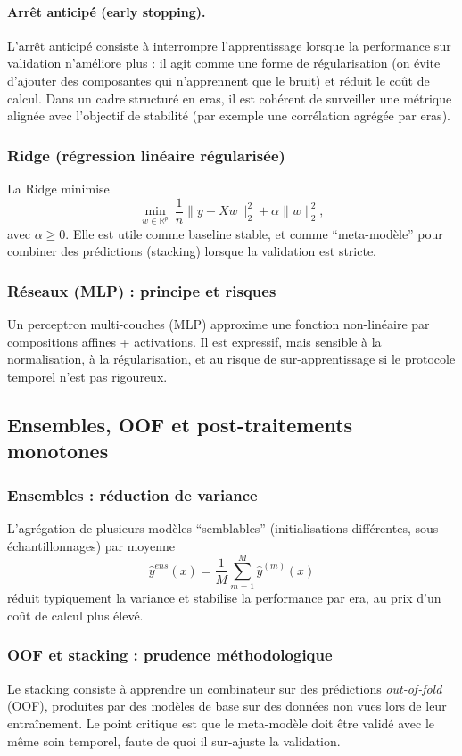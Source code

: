 \documentclass[11pt,a4paper]{article}
\newcommand{\R}{\mathbb{R}}
\newcommand{\1}{\mathbf{1}}
\begin{document}
\paragraph{Arr\^et anticip\'e (early stopping).}
L'arr\^et anticip\'e consiste \`a interrompre l'apprentissage lorsque la performance sur validation n'am\'eliore plus : il agit comme une forme
de r\'egularisation (on \'evite d'ajouter des composantes qui n'apprennent que le bruit) et r\'eduit le co\^ut de calcul.
Dans un cadre structur\'e en eras, il est coh\'erent de surveiller une m\'etrique align\'ee avec l'objectif de stabilit\'e (par exemple une corr\'elation agr\'eg\'ee par eras).

\subsubsection{Ridge (r\'egression lin\'eaire r\'egularis\'ee)}
La Ridge minimise
\[
\min_{w\in\R^p}\ \frac{1}{n}\|y-Xw\|_2^2 + \alpha\|w\|_2^2,
\]
avec $\alpha\ge 0$. Elle est utile comme baseline stable, et comme ``meta-mod\`ele'' pour combiner des pr\'edictions (stacking) lorsque la validation est stricte.

\subsubsection{R\'eseaux (MLP) : principe et risques}
Un perceptron multi-couches (MLP) approxime une fonction non-lin\'eaire par compositions affines + activations. Il est expressif, mais sensible \`a la
normalisation, \`a la r\'egularisation, et au risque de sur-apprentissage si le protocole temporel n'est pas rigoureux.

\subsection{Ensembles, OOF et post-traitements monotones}

\subsubsection{Ensembles : r\'eduction de variance}
L'agr\'egation de plusieurs mod\`eles ``semblables'' (initialisations diff\'erentes, sous-\'echantillonnages) par moyenne
\[
\widehat y^{ens}(x)=\frac{1}{M}\sum_{m=1}^M \widehat y^{(m)}(x)
\]
r\'eduit typiquement la variance et stabilise la performance par era, au prix d'un co\^ut de calcul plus \'elev\'e.

\subsubsection{OOF et stacking : prudence m\'ethodologique}
Le stacking consiste \`a apprendre un combinateur sur des pr\'edictions \emph{out-of-fold} (OOF), produites par des mod\`eles de base sur des donn\'ees non vues
lors de leur entra\^{i}nement. Le point critique est que le meta-mod\`ele doit \^etre valid\'e avec le m\^eme soin temporel, faute de quoi il sur-ajuste
la validation.
\end{document}
